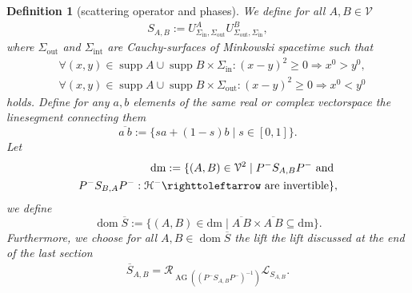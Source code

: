 \documentclass[b5paper,draft,openbib,12pt]{memoir}
\newtheorem{Def}{Definition}
\DeclareMathOperator*{\supp}{supp}
\DeclareMathOperator{\AG}{AG}
\DeclareMathOperator{\dom}{dom}
\begin{document}
\begin{Def}[scattering operator and phases]\label{def: S bar, gamma, cA}
We define for all \(A,B\in\mathcal{V} \)
\begin{align}
S_{A,B}:=U^{A}_{\Sigma_{\mathrm{in}},\Sigma_{\mathrm{out}}}U^{B}_{\Sigma_{\mathrm{out}},\Sigma_{\mathrm{in}}},
\end{align}
where \(\Sigma_{\mathrm{out}}\) and \(\Sigma_{\mathrm{int}}\)  are Cauchy-surfaces of Minkowski spacetime such that 
\begin{align}
&\forall (x,y)\in \supp A\cup\supp B\times \Sigma_{\mathrm{in}}: (x-y)^2 \ge 0\Rightarrow x^0>y^0,\\
&\forall (x,y)\in \supp A\cup\supp B\times \Sigma_{\mathrm{out}}: (x-y)^2 \ge 0\Rightarrow x^0<y^0
\end{align}
holds.
Define for any \(a,b\) elements of the same real or complex 
vectorspace the linesegment connecting them 
\begin{equation}
  \overline{a~b}:=\{sa+(1-s)b\mid s\in[0,1]\}.
\end{equation}
Let 
\begin{align}
\mathrm{dm}:=\{(A,B)\in\mathcal{V}^2\mid P^- S_{A,B}P^-\text{ and }\\
 P^- S_{B,A}P^-:\mathcal{H}^- \righttoleftarrow  \text{ are invertible}\},
\end{align}
we define
\begin{equation}\label{dom s bar}
\dom\overline{S}:=\{(A,B)\in \mathrm{dm}\mid  \overline{A~B}\times\overline{A~B} \subseteq \mathrm{dm} \}.
\end{equation}
Furthermore, we choose for all \(A,B\in \dom \overline{S}\) the lift the lift discussed at 
the end of the last section
\begin{align}
\overline{S}_{A,B}=\mathcal{R}_{\AG((P^- S_{A,B}P^-)^{-1})} \mathcal{L}_{S_{A,B}}.
\end{align}


\end{Def}
\end{document}

